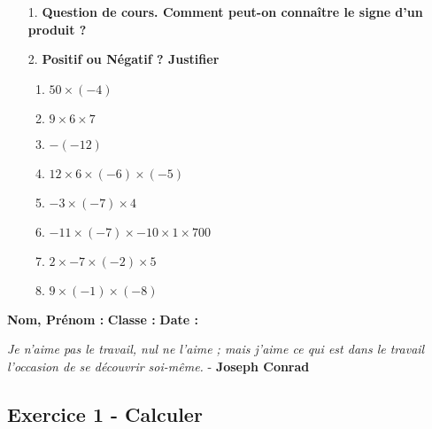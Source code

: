 \documentclass[11pt]{article}
\newcommand{\Pointilles}[1][3]{%
  \multido{}{#1}{\makebox[\linewidth]{\dotfill}\\[\parskip]
}}
\begin{document}
\begin{enumerate}
    \item[1.] \textbf{Question de cours. Comment peut-on connaître le signe d'un produit ?} \\
    \Pointilles[3]

    \item[2.] \textbf{Positif ou Négatif ? Justifier} 
    \begin{enumerate}
        \item $50 \times (-4)$ \dotfill
        \item $9 \times 6 \times 7$ \dotfill
        \item $ -(-12)$ \dotfill
        \item $12 \times 6 \times (-6) \times (-5)$ \dotfill
        \item $-3 \times (-7) \times 4$ \dotfill
        \item $-11 \times (-7) \times -10 \times 1 \times 700$ \dotfill
        \item $2 \times -7 \times (-2) \times 5$ \dotfill
        \item $9 \times (-1) \times (-8)$ \dotfill
    \end{enumerate}
\end{enumerate}

\newpage

\textbf{Nom, Prénom :} \hspace{8cm} \textbf{Classe :} \hspace{3cm} \textbf{Date :}\\
\vspace{-0.8cm}
\begin{center}
  \textit{Je n'aime pas le travail, nul ne l'aime ; mais j'aime ce qui est dans le travail l'occasion de se découvrir soi-même.}  - \textbf{Joseph Conrad}
\end{center}
\vspace{-0.8cm}

\subsection*{Exercice 1 - Calculer}
\end{document}
